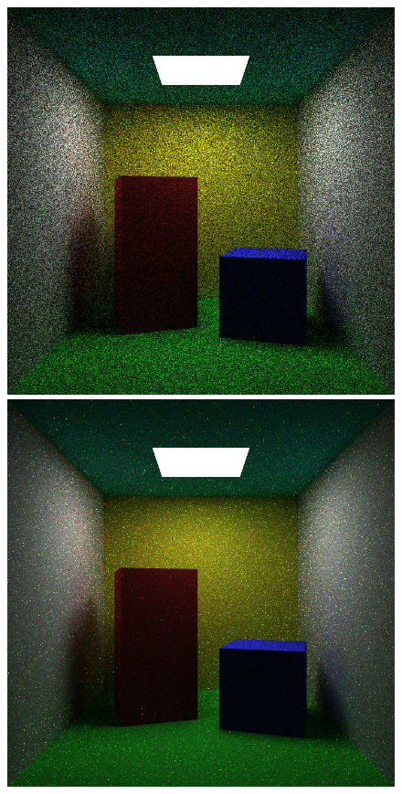 \documentclass[ %
                    author={Callum Pearce},
                supervisor={Dr. Neill Campbell},
                    degree={MEng},
                     title={Learning the incident radiance for a continuous state space rather than a discrete one is more beneficial for Importance Sampling in Monte Carlo Path tracing},
                  subtitle={},
                      type={research},
                      year={2019} ]{dissertation}
\begin{document}
\begin{figure}[h]
\centering
{}
  \includegraphics[width=\textwidth]{images/renders/cornell/default.png}   
\endminipage\hspace{1em}
  \includegraphics[width=\textwidth]{images/renders/cornell/sarsa.png}   

\end{figure}
\end{document}

